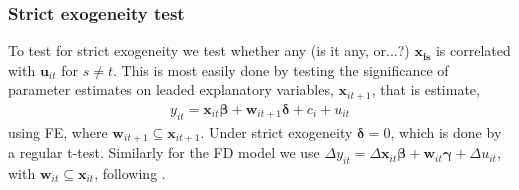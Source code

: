 
\subsubsection*{Strict exogeneity test}

To test for strict exogeneity we test whether any (is it any, or...?) $\bm{x_{is}}$ is correlated with $\bm{u}_{it}$ for $s \neq t$. This is most easily done by testing the significance of parameter estimates on leaded explanatory variables, $\bm{x}_{it+1}$, that is estimate, 
\begin{align*}
    y_{it} = \bm{x}_{it} \bm{\beta} + \bm{w}_{it+1} \bm{\delta} + c_i + u_{it}
\end{align*} 
using FE, where $\bm{w}_{it+1} \subseteq \bm{x}_{it+1}$. Under strict exogeneity $\bm{\delta} = 0$, which is done by a regular t-test. Similarly for the FD model we use $\Delta y_{it} = \Delta \bm{x}_{it} \bm{\beta} + \bm{w}_{it} \bm{\gamma} + \Delta u_{it}$, with $\bm{w}_{it} \subseteq \bm{x}_{it}$, following \cite[Chapter~10]{wooldridgeEconometricAnalysisCross2010}.

